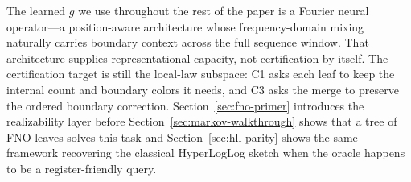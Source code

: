 The learned $g$ we use throughout the rest of the paper is a Fourier neural operator---a position-aware architecture whose frequency-domain mixing naturally carries boundary context across the full sequence window. That architecture supplies representational capacity, not certification by itself. The certification target is still the local-law subspace: C1 asks each leaf to keep the internal count and boundary colors it needs, and C3 asks the merge to preserve the ordered boundary correction. Section~\ref{sec:fno-primer} introduces the realizability layer before Section~\ref{sec:markov-walkthrough} shows that a tree of FNO leaves solves this task and Section~\ref{sec:hll-parity} shows the same framework recovering the classical HyperLogLog sketch when the oracle happens to be a register-friendly query.
